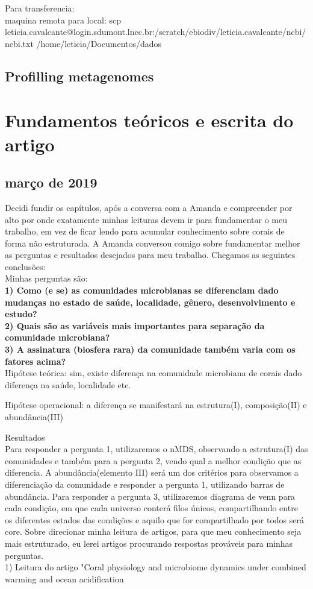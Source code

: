 \documentclass[12pt, a4paper]{report}
\begin{document}
Para transferencia: \\
maquina remota para local:
scp leticia.cavalcante@login.sdumont.lncc.br:/scratch/ebiodiv/leticia.cavalcante/ncbi/ncbi.txt /home/leticia/Documentos/dados

\section{Profilling metagenomes}

\chapter{Fundamentos teóricos e escrita do artigo}
\section{março de 2019}
Decidi fundir os capítulos, após a conversa com a Amanda e compreender por alto por onde exatamente minhas leituras devem ir para fundamentar o meu trabalho, em vez de ficar lendo para acumular conhecimento sobre corais de forma não estruturada.
A Amanda conversou comigo sobre fundamentar melhor as perguntas e resultados desejados para meu trabalho. Chegamos as seguintes conclusões: \\
Minhas perguntas são: \\
\textbf{1) Como (e se) as comunidades microbianas se diferenciam dado mudanças no estado de saúde, localidade, gênero, desenvolvimento e estudo?}\\
\textbf{2) Quais são as variáveis mais importantes para separação da comunidade microbiana?}\\
\textbf{3) A assinatura (biosfera rara) da comunidade também varia com os fatores acima?}\\

Hipótese teórica: sim, existe diferença na comunidade microbiana de corais dado diferença na saúde, localidade etc. 

Hipótese operacional: a diferença se manifestará na estrutura(I), composição(II) e abundância(III)

Resultados\\
Para responder a pergunta 1, utilizaremos o nMDS, observando a estrutura(I) das comunidades e também para a pergunta 2, vendo qual a melhor condição que as diferencia.
A abundância(elemento III) será um dos critérios para observamos a diferenciação da comunidade e responder a pergunta 1, utilizando barras de abundância. 
Para responder a pergunta 3, utilizaremos diagrama de venn para cada condição, em que cada universo conterá filos únicos, compartilhando entre os diferentes estados das condições e aquilo que for compartilhado por todos será core. 
Sobre direcionar minha leitura de artigos, para que meu conhecimento seja mais estruturado, eu lerei artigos procurando respostas prováveis para minhas perguntas. \\
1) Leitura do artigo "Coral physiology and microbiome dynamics under combined warming and ocean acidification 
   
\end{document}
